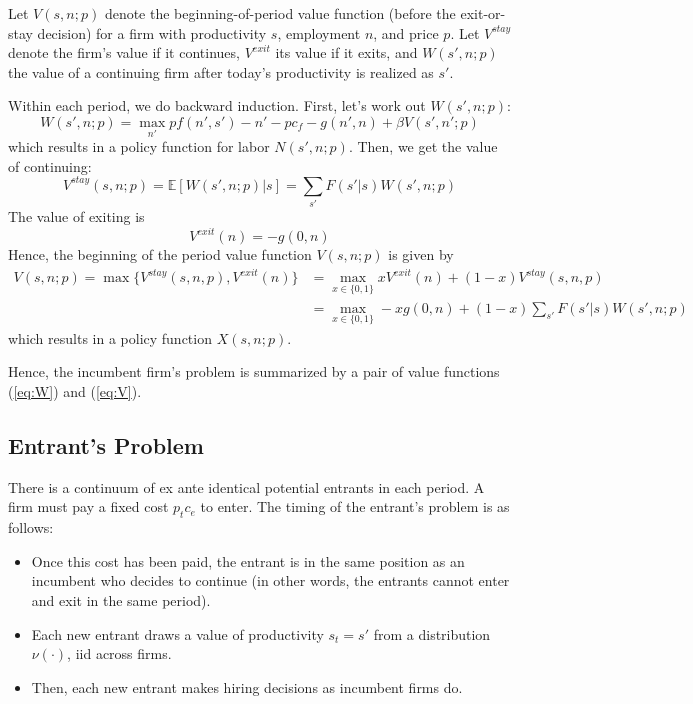 \documentclass[12pt]{article}
\begin{document}
Let $V(s, n; p)$ denote the beginning-of-period value function (before the exit-or-stay decision) for a firm with productivity $s$, employment $n$, and price $p$. Let $V^{stay}$ denote the firm's value if it continues, $V^{exit}$ its value if it exits, and $W(s',n;p)$ the value of a continuing firm after today's productivity is realized as $s'$. 

Within each period, we do backward induction. First, let's work out $W(s', n;p)$: 
\begin{equation} \label{eq:W}
	W(s', n; p) = \max_{n'} p f(n', s') - n' - pc_f - g(n', n) + \beta V(s', n'; p)
\end{equation}
which results in a policy function for labor $N(s',n;p)$. Then, we get the value of continuing:
\begin{equation}
	V^{stay}(s,n;p) = \mathbb{E}[W(s', n; p)|s] = \sum_{s'} F(s'|s) W(s', n; p)
\end{equation}
The value of exiting is
\begin{equation}
	V^{exit}(n) = -g(0, n)
\end{equation}
Hence, the beginning of the period value function $V(s,n;p)$ is given by
\begin{align}
	V(s,n;p) = \max\{V^{stay}(s,n,p), V^{exit}(n)\} & = \max_{x \in \{0,1\}} x V^{exit}(n) + (1-x) V^{stay}(s,n,p) \nonumber \\
	& = \max_{x \in \{0,1\}} -x g(0,n) + (1-x) \sum_{s'} F(s'|s) W(s', n; p) \label{eq:V}
\end{align}
which results in a policy function $X(s,n;p)$.

Hence, the incumbent firm's problem is summarized by a pair of value functions (\ref{eq:W}) and (\ref{eq:V}).


\subsection{Entrant's Problem} 
There is a continuum of ex ante identical potential entrants in each period. A firm must pay a fixed cost $p_t c_e$ to enter. The timing of the entrant's problem is as follows:
\begin{itemize}
\item Once this cost has been paid, the entrant is in the same position as an incumbent who decides to continue (in other words, the entrants cannot enter and exit in the same period).
\item Each new entrant draws a value of productivity $s_t = s'$ from a distribution $\nu(\cdot)$, iid across firms.
\item Then, each new entrant makes hiring decisions as incumbent firms do.
\end{itemize}
\end{document}
